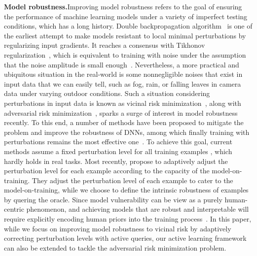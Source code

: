 \documentclass[letterpaper]{article} %
\begin{document}
\textbf{Model robustness.}\quad Improving model robustness refers to the goal of ensuring the performance of machine learning models under a variety of imperfect testing conditions, which has a long history. Double backpropagation algorithm~\cite{drucker1991double} is one of the earliest attempt to make models resistant to local minimal perturbations by regularizing input gradients. It reaches a consensus with Tikhonov regularization~\cite{tikhonov1977solutions}, which is equivalent to training with noise under the assumption that the noise amplitude is small enough~\cite{bishop1995training}. Nevertheless, a more practical and ubiquitous situation in the real-world is some nonnegligible noises that exist in input data that we can easily tell, such as fog, rain, or falling leaves in camera data under varying outdoor conditions. Such a situation considering perturbations in input data is known as vicinal risk minimization~\cite{chapelle2001vicinal}, along with adversarial risk minimization~\cite{uesato2018adversarial}, sparks a surge of interest in model robustness recently.
To this end, a number of methods have been proposed to mitigate the problem and improve the robustness of DNNs, among which finally training with perturbations remains the most effective one~\cite{carlini2019evaluating, hendrycks2019augmix, rusak2020increasing}.
To achieve this goal, current methods assume a fixed perturbation level for all training examples \cite{madry2017towards, wang2020improving, zhang2019theoretically, rusak2020increasing, Cemgil2020Adversarially}, which hardly holds in real tasks. Most recently, \cite{cheng2020cat, sitawarin2020improving, zhang2020attacks} propose to adaptively adjust the perturbation level for each example according to the capacity of the model-on-training. They adjust the perturbation level of each example to cater to the model-on-training, while we choose to define the intrinsic robustness of examples by quering the oracle.
Since model vulnerability can be view as a purely human-centric phenomenon, and achieving models that are robust and interpretable will require explicitly encoding human priors into the training process~\cite{ilyas2019adversarial}. In this paper, while we focus on improving model robustness to vicinal risk by adaptively correcting perturbation levels with active queries, our active learning framework can also be extended to tackle the adversarial risk minimization problem.
\end{document}

